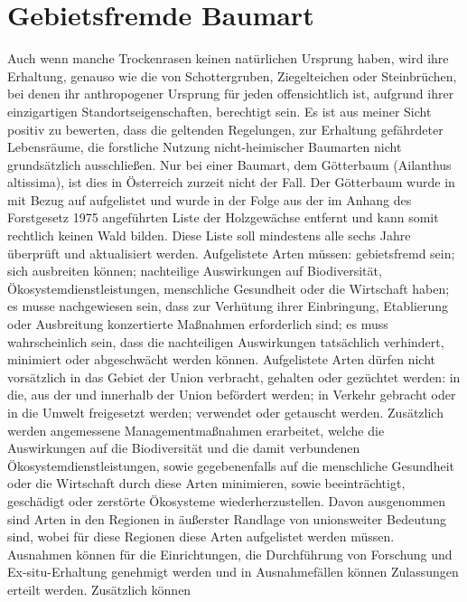 \documentclass[twocolumn]{scrartcl}
\begin{document}
\section{Gebietsfremde Baumart}

Auch wenn manche Trockenrasen keinen natürlichen Ursprung haben, wird ihre
Erhaltung, genauso wie die von Schottergruben, Ziegelteichen oder Steinbrüchen,
bei denen ihr anthropogener Ursprung für jeden offensichtlich ist, aufgrund
ihrer einzigartigen Standortseigenschaften, berechtigt sein. Es ist aus meiner
Sicht positiv zu bewerten, dass die geltenden Regelungen, zur Erhaltung
gefährdeter Lebensräume, die forstliche Nutzung nicht-heimischer Baumarten nicht
grundsätzlich ausschließen. Nur bei einer Baumart, dem Götterbaum (Ailanthus
altissima), ist dies in Österreich zurzeit nicht der Fall. Der Götterbaum wurde
in \cite{eu2019verordnungListeInvasiverArten} mit Bezug auf
\cite{eu2014verordnungInvasiverArten} aufgelistet und wurde in der Folge aus der
im Anhang des Forstgesetz 1975 angeführten Liste der Holzgewächse entfernt und
kann somit rechtlich keinen Wald bilden. Diese Liste soll mindestens alle sechs
Jahre überprüft und aktualisiert werden. Aufgelistete Arten müssen: gebietsfremd
sein; sich ausbreiten können; nachteilige Auswirkungen auf Biodiversität,
Ökosystemdienstleistungen, menschliche Gesundheit oder die Wirtschaft haben; es
musse nachgewiesen sein, dass zur Verhütung ihrer Einbringung, Etablierung oder
Ausbreitung konzertierte Maßnahmen erforderlich sind; es muss wahrscheinlich
sein, dass die nachteiligen Auswirkungen tatsächlich verhindert, minimiert oder
abgeschwächt werden können. Aufgelistete Arten dürfen nicht vorsätzlich in das
Gebiet der Union verbracht, gehalten oder gezüchtet werden: in die, aus der und
innerhalb der Union befördert werden; in Verkehr gebracht oder in die Umwelt
freigesetzt werden; verwendet oder getauscht werden. Zusätzlich werden
angemessene Managementmaßnahmen erarbeitet, welche die Auswirkungen auf die
Biodiversität und die damit verbundenen Ökosystemdienstleistungen, sowie
gegebenenfalls auf die menschliche Gesundheit oder die Wirtschaft durch diese
Arten minimieren, sowie beeinträchtigt, geschädigt oder zerstörte Ökosysteme
wiederherzustellen. Davon ausgenommen sind Arten in den Regionen in äußerster
Randlage von unionsweiter Bedeutung sind, wobei für diese Regionen diese Arten
aufgelistet werden müssen. Ausnahmen können für die Einrichtungen, die
Durchführung von Forschung und Ex-situ-Erhaltung genehmigt werden und in
Ausnahmefällen können Zulassungen erteilt werden. Zusätzlich können
\end{document}
